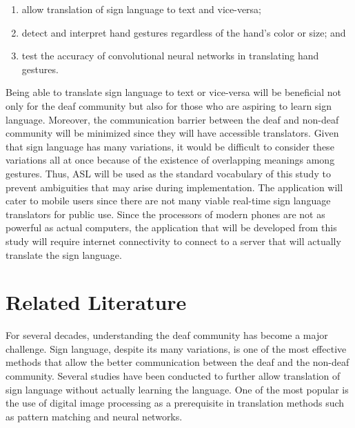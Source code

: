 \documentclass[journal]{./IEEE/IEEEtran}
\begin{document}
\begin{enumerate}
\item allow translation of sign language to text and vice-versa;
\item detect and interpret hand gestures regardless of the hand's color or size; and
\item test the accuracy of convolutional neural networks in translating hand gestures.
\end{enumerate}

\indent Being able to translate sign language to text or vice-versa will be beneficial not only for the deaf community but also for those who are aspiring to learn sign language. Moreover, the communication barrier between the deaf and non-deaf community will be minimized since they will have accessible translators.
\newline
\indent Given that sign language has many variations, it would be difficult to consider these variations all at once because of the existence of overlapping meanings among gestures. Thus, ASL will be used as the standard vocabulary of this study to prevent ambiguities that may arise during implementation.
\newline
\indent The application will cater to mobile users since there are not many viable real-time sign language translators for public use. Since the processors of modern phones are not as powerful as actual computers, the application that will be developed from this study will require internet connectivity to connect to a server that will actually translate the sign language.

\section{Related Literature}
For several decades, understanding the deaf community has become a major challenge. Sign language, despite its many variations, is one of the most effective methods that allow the better communication between the deaf and the non-deaf community. Several studies have been conducted to further allow translation of sign language without actually learning the language. One of the most popular is the use of digital image processing as a prerequisite in translation methods such as pattern matching and neural networks.
\end{document}
